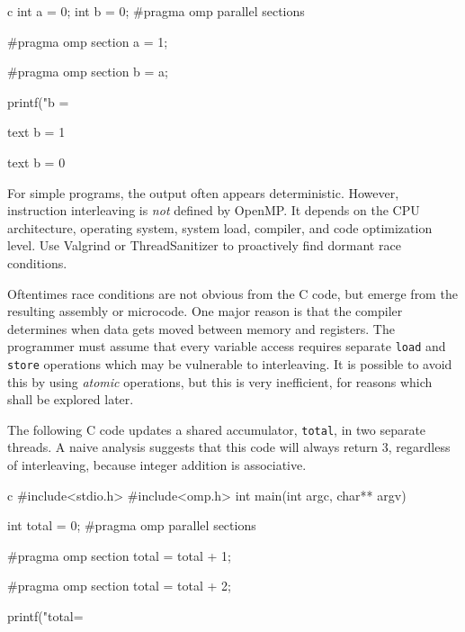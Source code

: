 \documentclass[conference, a4paper]{IEEEtran-modified}
\begin{document}
      \begin{ccode}[]{c}
        int a = 0;
        int b = 0;
        #pragma omp parallel sections
        {
          #pragma omp section
          a = 1;

          #pragma omp section
          b = a;
        }
        printf("b = %

      \begin{ccode}[]
        {text}
        b = 1\end{ccode}
      \begin{ccode}[]
        {text}
        b = 0\end{ccode}

For simple programs, the output often appears deterministic. However, instruction interleaving is \emph{not} defined by OpenMP. It depends on the CPU architecture, operating system, system load, compiler, and code optimization level. Use Valgrind or ThreadSanitizer to proactively find dormant race conditions.

Oftentimes race conditions are not obvious from the C code, but emerge from the resulting assembly or microcode. One major reason is that the compiler determines when data gets moved between memory and registers. The programmer must assume that every variable access requires separate \texttt{load} and \texttt{store} operations which may be vulnerable to interleaving. It is possible to avoid this by using \emph{atomic} operations, but this is very inefficient, for reasons which shall be explored later. 

The following C code updates a shared accumulator, \texttt{total}, in two separate threads. A naive analysis suggests that this code will always return 3, regardless of interleaving, because integer addition is associative.

        \begin{ccode}[]{c}
        #include<stdio.h>
        #include<omp.h>
        int main(int argc, char** argv) {

          int total = 0;
          #pragma omp parallel sections
          {
            #pragma omp section
            {
              total = total + 1;
            }

            #pragma omp section
            {
              total = total + 2;
            }
          }
          printf("total=%
        }
\end{ccode}




\end{ccode}
\end{document}
